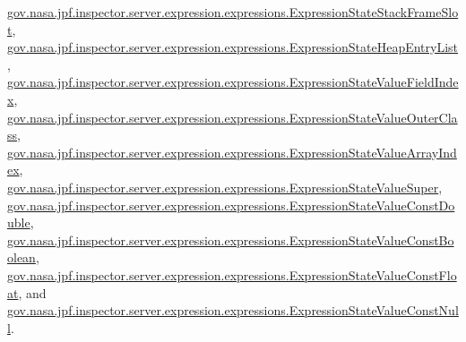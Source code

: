 \hyperlink{classgov_1_1nasa_1_1jpf_1_1inspector_1_1server_1_1expression_1_1expressions_1_1_expression_state_stack_frame_slot_a4f04945cb68f2ad02d3fe8db36179f1f}{gov.\+nasa.\+jpf.\+inspector.\+server.\+expression.\+expressions.\+Expression\+State\+Stack\+Frame\+Slot}, \hyperlink{classgov_1_1nasa_1_1jpf_1_1inspector_1_1server_1_1expression_1_1expressions_1_1_expression_state_heap_entry_list_a177111768101430f6943fe04956579ca}{gov.\+nasa.\+jpf.\+inspector.\+server.\+expression.\+expressions.\+Expression\+State\+Heap\+Entry\+List}, \hyperlink{classgov_1_1nasa_1_1jpf_1_1inspector_1_1server_1_1expression_1_1expressions_1_1_expression_state_value_field_index_a27a15a9a4ea2cc283d8fe9c00f2a6a6f}{gov.\+nasa.\+jpf.\+inspector.\+server.\+expression.\+expressions.\+Expression\+State\+Value\+Field\+Index}, \hyperlink{classgov_1_1nasa_1_1jpf_1_1inspector_1_1server_1_1expression_1_1expressions_1_1_expression_state_value_outer_class_af25a48b00aad1fa3578e0554d1506c8d}{gov.\+nasa.\+jpf.\+inspector.\+server.\+expression.\+expressions.\+Expression\+State\+Value\+Outer\+Class}, \hyperlink{classgov_1_1nasa_1_1jpf_1_1inspector_1_1server_1_1expression_1_1expressions_1_1_expression_state_value_array_index_ad72611ba9e78fb2d724ad26d437600a9}{gov.\+nasa.\+jpf.\+inspector.\+server.\+expression.\+expressions.\+Expression\+State\+Value\+Array\+Index}, \hyperlink{classgov_1_1nasa_1_1jpf_1_1inspector_1_1server_1_1expression_1_1expressions_1_1_expression_state_value_super_a0e3c6a2aced7b9791f5c0842c734b78d}{gov.\+nasa.\+jpf.\+inspector.\+server.\+expression.\+expressions.\+Expression\+State\+Value\+Super}, \hyperlink{classgov_1_1nasa_1_1jpf_1_1inspector_1_1server_1_1expression_1_1expressions_1_1_expression_state_value_const_double_a42eedfe15044564e744061af712c7848}{gov.\+nasa.\+jpf.\+inspector.\+server.\+expression.\+expressions.\+Expression\+State\+Value\+Const\+Double}, \hyperlink{classgov_1_1nasa_1_1jpf_1_1inspector_1_1server_1_1expression_1_1expressions_1_1_expression_state_value_const_boolean_a1ddaedcf0fb85b579d3764d2154ea945}{gov.\+nasa.\+jpf.\+inspector.\+server.\+expression.\+expressions.\+Expression\+State\+Value\+Const\+Boolean}, \hyperlink{classgov_1_1nasa_1_1jpf_1_1inspector_1_1server_1_1expression_1_1expressions_1_1_expression_state_value_const_float_aedd6f475efc09580ba128165d42760df}{gov.\+nasa.\+jpf.\+inspector.\+server.\+expression.\+expressions.\+Expression\+State\+Value\+Const\+Float}, and \hyperlink{classgov_1_1nasa_1_1jpf_1_1inspector_1_1server_1_1expression_1_1expressions_1_1_expression_state_value_const_null_a6edbf78a9e14eae34d8f7de9d33d0a32}{gov.\+nasa.\+jpf.\+inspector.\+server.\+expression.\+expressions.\+Expression\+State\+Value\+Const\+Null}.

